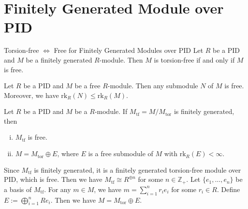 \section{Finitely Generated Module over PID}

\begin{proposition}{Torsion-free $\iff$ Free for Finitely Generated Modules over PID}{}
    Let $R$ be a PID and $M$ be a finitely generated $R$-module. Then $M$ is torsion-free if and only if $M$ is free.
\end{proposition}

\begin{proposition}{}{}
    Let $R$ be a PID and $M$ be a free $R$-module. Then any submodule $N$ of $M$ is free. Moreover, we have $\mathrm{rk}_R(N)\le \mathrm{rk}_R(M)$.
\end{proposition}

\begin{proposition}{}{}
    Let $R$ be a PID and $M$ be a $R$-module. If $M_{\mathrm{tf}}=M/M_{\mathrm{tor}}$ is finitely generated, then 
    \begin{enumerate}[(i)]
        \item $M_{\mathrm{tf}}$ is free.
        \item $M=M_{\mathrm{tor}}\oplus E$, where $E$ is a free submodule of $M$ with $\mathrm{rk}_R(E)<\infty$.
    \end{enumerate}
\end{proposition}
\begin{prf}
    Since $M_{\mathrm{tf}}$ is finitely generated, it is a finitely generated torsion-free module over PID, which is free. Then we have $M_{\mathrm{tf}}\cong R^{\oplus n}$ for some $n\in \mathbb{Z}_+$. Let $\{e_1, \ldots, e_n\}$ be a basis of $M_{\mathrm{tf}}$. For any $m\in M$, we have $m=\sum_{i=1}^n r_i e_i$ for some $r_i\in R$. Define $E:=\bigoplus_{i=1}^n Re_i$. Then we have $M=M_{\mathrm{tor}}\oplus E$.
\end{prf}







